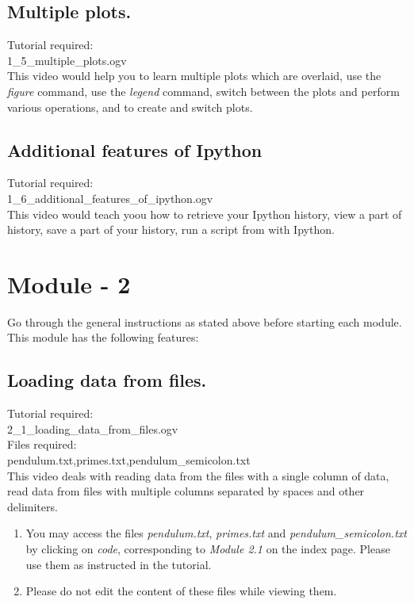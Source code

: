 \documentclass[11pt,twocolumn]{article}
\newenvironment{enumcpt}{\begin{enumerate} \topsep 0pt \partopsep 0pt 
                        \parsep 0pt
                        \itemsep 0pt \leftmargin -1in \rightmargin 0pt
                        }{\end{enumerate}}
\begin{document}
    \subsection{Multiple plots.}
    Tutorial required: \\ 1\_5\_multiple\_plots.ogv \\
      This video would help you to learn multiple plots which are overlaid, use the \emph{figure} command, use the \emph{legend} command, switch between the plots and perform various operations, and to create and switch plots. 

    \subsection{Additional features of Ipython}
     Tutorial required: \\ 1\_6\_additional\_features\_of\_ipython.ogv \\
    This video would teach yoou how to retrieve your Ipython history, view a part of history, save a part of your history, run a script from with Ipython. \\

\section{Module - 2}
Go through the general instructions as stated above before starting each module.\\
This module has the following features:
  \subsection{Loading data from files.}
  Tutorial required: \\ 2\_1\_loading\_data\_from\_files.ogv \\
  Files required:\\ pendulum.txt,primes.txt,pendulum\_semicolon.txt \\
  This video deals with reading data from the files with a single column of data, read data from files with multiple columns separated by spaces and other delimiters. 
\begin{enumcpt}
\item You may access the files \emph{pendulum.txt}, \emph{primes.txt} and \emph{pendulum\_semicolon.txt} by clicking on \emph{code}, corresponding to \emph{Module 2.1} on the index page. Please use them as instructed in the tutorial. 
\item Please do not edit the content of these files while viewing them.
\end{enumcpt}
\end{document}
